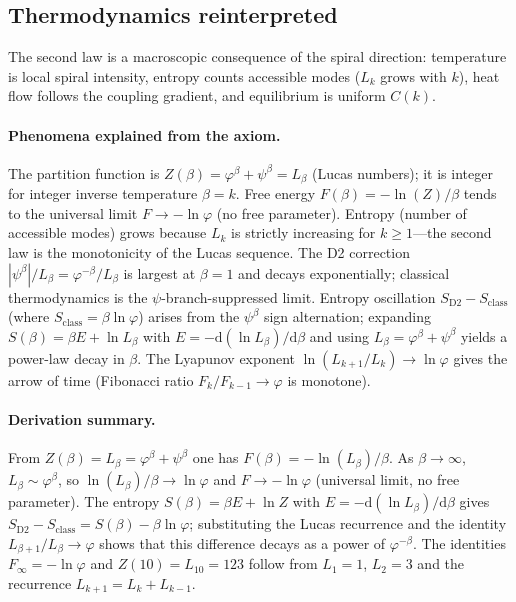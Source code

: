 \documentclass[12pt,a4paper]{article}
\begin{document}
\subsection{Thermodynamics reinterpreted}
\label{sec:thermo-reinterpreted}

The second law is a macroscopic consequence of the spiral direction: temperature is local spiral intensity, entropy counts accessible modes ($L_k$ grows with $k$), heat flow follows the coupling gradient, and equilibrium is uniform $C(k)$.

\paragraph{Phenomena explained from the axiom.}
The partition function is $Z(\beta) = \varphi^\beta + \psi^\beta = L_\beta$ (Lucas numbers); it is integer for integer inverse temperature $\beta = k$. Free energy $F(\beta) = -\ln(Z)/\beta$ tends to the universal limit $F \to -\ln\varphi$ (no free parameter). Entropy (number of accessible modes) grows because $L_k$ is strictly increasing for $k \geq 1$---the second law is the monotonicity of the Lucas sequence. The D2 correction $|\psi^\beta|/L_\beta = \varphi^{-\beta}/L_\beta$ is largest at $\beta=1$ and decays exponentially; classical thermodynamics is the $\psi$-branch-suppressed limit. Entropy oscillation $S_{\mathrm{D2}} - S_{\mathrm{class}}$ (where $S_{\mathrm{class}} = \beta\ln\varphi$) arises from the $\psi^\beta$ sign alternation; expanding $S(\beta)=\beta E+\ln L_\beta$ with $E=-\mathrm{d}(\ln L_\beta)/\mathrm{d}\beta$ and using $L_\beta=\varphi^\beta+\psi^\beta$ yields a power-law decay in $\beta$. The Lyapunov exponent $\ln(L_{k+1}/L_k) \to \ln\varphi$ gives the arrow of time (Fibonacci ratio $F_k/F_{k-1} \to \varphi$ is monotone).

\paragraph{Derivation summary.}
From $Z(\beta)=L_\beta=\varphi^\beta+\psi^\beta$ one has $F(\beta)=-\ln(L_\beta)/\beta$. As $\beta\to\infty$, $L_\beta\sim\varphi^\beta$, so $\ln(L_\beta)/\beta\to\ln\varphi$ and $F\to-\ln\varphi$ (universal limit, no free parameter). The entropy $S(\beta)=\beta E+\ln Z$ with $E=-\mathrm{d}(\ln L_\beta)/\mathrm{d}\beta$ gives $S_{\mathrm{D2}}-S_{\mathrm{class}}=S(\beta)-\beta\ln\varphi$; substituting the Lucas recurrence and the identity $L_{\beta+1}/L_\beta\to\varphi$ shows that this difference decays as a power of $\varphi^{-\beta}$. The identities $F_\infty=-\ln\varphi$ and $Z(10)=L_{10}=123$ follow from $L_1=1$, $L_2=3$ and the recurrence $L_{k+1}=L_k+L_{k-1}$.
\end{document}
